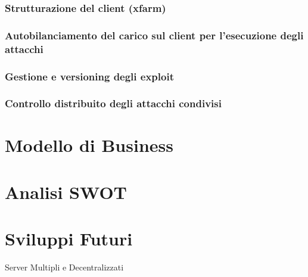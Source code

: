 \documentclass[11pt]{article}
\begin{document}
\subsubsection{Strutturazione del client (xfarm)}
\subsubsection{Autobilanciamento del carico sul client per l'esecuzione degli attacchi}
\subsubsection{Gestione e versioning degli exploit}
\subsubsection{Controllo distribuito degli attacchi condivisi}
\section{Modello di Business}
\section{Analisi SWOT}
\section{Sviluppi Futuri}
Server Multipli e Decentralizzati
\end{document}
